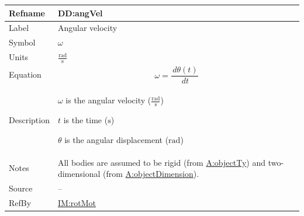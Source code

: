 \documentclass[12pt]{article}
\begin{document}
\vspace{\baselineskip}
\noindent
\begin{minipage}{\textwidth}
\begin{tabular}{>{\raggedright}p{}>{\raggedright\arraybackslash}p{}}
\toprule \textbf{Refname} & \textbf{DD:angVel}
\label{DD:angVel}
\\ \midrule
Label & Angular velocity
        
\\ \midrule
Symbol & $ω$
         
\\ \midrule
Units & $\frac{\text{rad}}{\text{s}}$
        
\\ \midrule
Equation & \begin{displaymath}
           ω=\frac{\,dθ\left(t\right)}{\,dt}
           \end{displaymath}
\\ \midrule
Description & \begin{symbDescription}
              \item{$ω$ is the angular velocity ($\frac{\text{rad}}{\text{s}}$)}
              \item{$t$ is the time (${\text{s}}$)}
              \item{$θ$ is the angular displacement (${\text{rad}}$)}
              \end{symbDescription}
\\ \midrule
Notes & All bodies are assumed to be rigid (from \hyperref[assumpOT]{A:objectTy}) and two-dimensional (from \hyperref[assumpOD]{A:objectDimension}).
        
\\ \midrule
Source & --
         
\\ \midrule
RefBy & \hyperref[IM:rotMot]{IM:rotMot}
        
\\ \bottomrule
\end{tabular}
\end{minipage}
\end{document}
